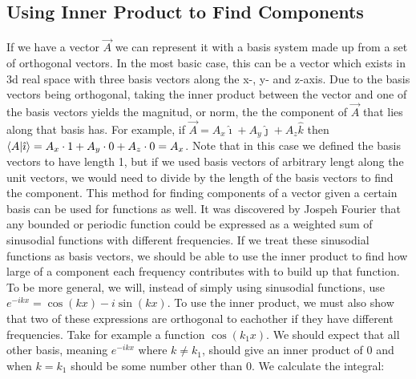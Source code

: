 \subsection{Using Inner Product to Find Components}

If we have a vector $\vec{A}$ we can represent it with a basis system made up from a set of orthogonal vectors. In the most basic case, this can be a vector which exists in 3d real space with three basis vectors along the x-, y- and z-axis. Due to the basis vectors being orthogonal, taking the inner product between the vector and one of the basis vectors yields the magnitud, or norm, the the component of $\vec{A}$ that lies along that basis has. For example, if $\vec{A}=A_x\hat\imath + A_y\hat\jmath + A_z\hat k$ then $\braket{A}{\hat\imath} = A_x\cdot 1 + A_y \cdot 0 + A_z \cdot 0 = A_x$. Note that in this case we defined the basis vectors to have length 1, but if we used basis vectors of arbitrary lengt along the unit vectors, we would need to divide by the length of the basis vectors to find the component. This method for finding components of a vector given a certain basis can be used for functions as well. It was discovered by Jospeh Fourier that any bounded or periodic function could be expressed as a weighted sum of sinusodial functions with different frequencies. If we treat these sinusodial functions as basis vectors, we should be able to use the inner product to find how large of a component each frequency contributes with to build up that function. To be more general, we will, instead of simply using sinusodial functions, use $e^{-ikx}=\cos(kx)-i\sin(kx)$. To use the inner product, we must also show that two of these expressions are orthogonal to eachother if they have different frequencies. Take for example a function $\cos(k_1x)$. We should expect that all other basis, meaning $e^{-ikx}$ where $k\not=k_1$, should give an inner product of 0 and when $k=k_1$ should be some number other than 0. We calculate the integral:

